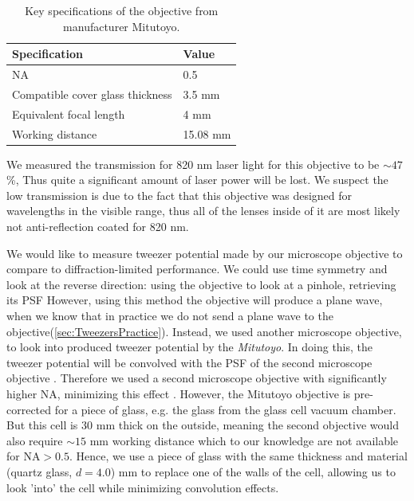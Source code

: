 \begin{table}[h]
	\centering
	\caption{Key specifications of the objective from manufacturer Mitutoyo.}
	\label{table:MitutoyoSpecs}
	\begin{tabular}{l | l}
		\textbf{Specification}          & \textbf{Value} \\ \hline 
		NA                              & 0.5            \\ \hline
		Compatible cover glass thickness& 3.5 mm         \\ \hline
		Equivalent focal length         & 4 mm           \\ \hline
		Working distance                & 15.08 mm      
	\end{tabular}
\end{table}
\noindent We measured the transmission for 820 nm laser light for this objective to be $\sim 47$\%, 
Thus quite a significant amount of laser power will be lost. 
We suspect the low transmission is due to the fact that this objective was designed for wavelengths in the visible range, thus all of the lenses inside of it are most likely not anti-reflection coated for 820 nm.

We would like to measure tweezer potential made by our microscope objective to compare to diffraction-limited performance.
We could use time symmetry and look at the reverse direction: using the objective to look at a pinhole, retrieving its \acf{PSF} \cite{Knottnerus2018,Sortais2007}
However, using this method the objective will produce a plane wave, when we know that in practice we do not send a plane wave to the objective(\cref{sec:TweezersPractice}). 
Instead, we used another microscope objective, to look into produced tweezer potential by the \textit{Mitutoyo}. 
In doing this, the tweezer potential will be convolved with the \ac{PSF} of the second microscope objective \cite{Baumgaertner2017}.
Therefore we used a second microscope objective with significantly higher \ac{NA}, minimizing this effect \cite{Baumgaertner2017}. 
However, the Mitutoyo objective is pre-corrected for a piece of glass, e.g. the glass from the glass cell vacuum chamber. 
But this cell is 30 mm thick on the outside, meaning the second objective would also require $\sim 15$ mm working distance which to our knowledge are not available for $\text{NA}>0.5$.
Hence, we use a piece of glass with the same thickness and material (quartz glass, $d = 4.0$) mm to replace one of the walls of the cell, allowing us to look 'into' the cell while minimizing convolution effects.

